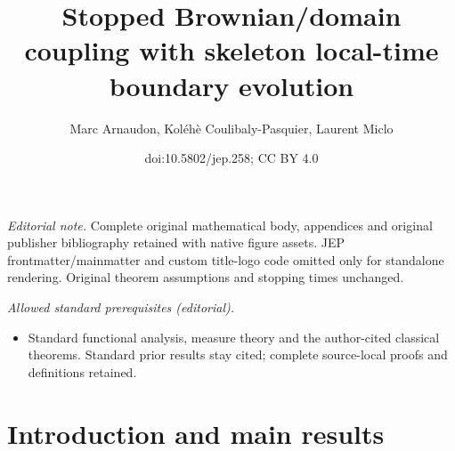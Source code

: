 \documentclass[10pt]{amsart}
\title{Stopped Brownian/domain coupling with skeleton local-time boundary evolution}
\author{Marc Arnaudon, Koléhè Coulibaly-Pasquier, Laurent Miclo}
\date{doi:10.5802/jep.258; CC BY 4.0}
\theoremstyle{plain}
\theoremstyle{definition}
\begin{document}
\maketitle
\noindent\textit{Editorial note.} Complete original mathematical body, appendices and original publisher bibliography retained with native figure assets. JEP frontmatter/mainmatter and custom title-logo code omitted only for standalone rendering. Original theorem assumptions and stopping times unchanged.\par\medskip
\noindent\textit{Allowed standard prerequisites (editorial).}\begin{itemize}
\item Standard functional analysis, measure theory and the author-cited classical theorems. Standard prior results stay cited; complete source-local proofs and definitions retained.
\end{itemize}\medskip
\vspace*{-\baselineskip}
\tableofcontents


\section{Introduction and main results}
\label{Section0}
\end{document}
